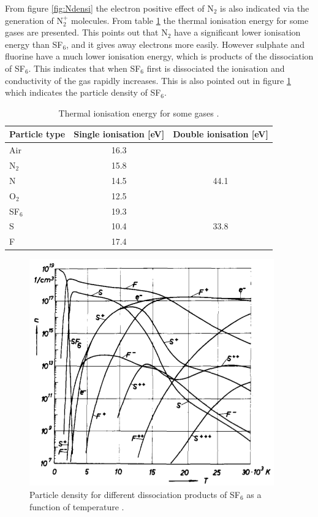 \documentclass[10pt,a4paper,twoside]{article}
\begin{document}
From figure \ref{fig:Ndensi} the electron positive effect of N$_2$ is also indicated via the generation of N$_{2}^{+}$ molecules. From table \ref{tab:thermalIonisation} the thermal ionisation energy for some gases are presented. This points out that N$_2$ have a significant lower ionisation energy than SF$_6$, and it gives away electrons more easily. However sulphate and fluorine have a much lower ionisation energy, which is products of the dissociation of SF$_6$. This indicates that when SF$_6$ first is dissociated the ionisation and conductivity of the gas rapidly increases. This is also pointed out in figure \ref{fig:SF6densi} which indicates the particle density of SF$_6$.

\begin{table}[H]
\center
\caption{Thermal ionisation energy for some gases \cite{bib:HVEbreak}.}
\begin{tabular}{|l|c|c|}
\hline 
Particle type & Single ionisation [eV] & Double ionisation [eV] \\ 
\hline 
Air & 16.3 &  \\ 
\hline 
N$_2$ & 15.8 &  \\ 
\hline 
N & 14.5 & 44.1 \\ 
\hline 
O$_2$ & 12.5 &  \\ 
\hline 
SF$_6$ & 19.3 &  \\ 
\hline 
S & 10.4 & 33.8 \\ 
\hline 
F & 17.4 &  \\ 
\hline 
\end{tabular} 
\label{tab:thermalIonisation}
\end{table}

\begin{figure}[H]
\centering
\includegraphics[scale=0.5]{Bilder/Theory/particleDensSF6.png}
\caption{Particle density for different dissociation products of SF$_6$ as a function of temperature \cite{bib:IPSF6AQM}.} \label{fig:SF6densi}
\end{figure}
\end{document}
